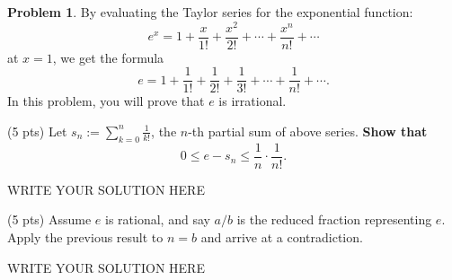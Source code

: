 \documentclass[11pt]{article}
\theoremstyle{plain}
\theoremstyle{definition}
\newtheorem{problem}{Problem}
\theoremstyle{remark}
\numberwithin{equation}{problem}
\begin{document}
\begin{problem}
	By evaluating the Taylor series for the exponential function:
	\[
		e^{x} = 1 + \frac{x}{1!} + \frac{x^2}{2!} + \cdots + \frac{x^n}{n!} + \cdots
	\]
	at $x=1$, we get the formula
	\[
		e = 1 + \frac{1}{1!} + \frac{1}{2!} + \frac{1}{3!} + \cdots + \frac{1}{n!} + \cdots.
	\]
	In this problem, you will prove that $e$ is irrational.
	\begin{listinprob}
		\item (5 pts) Let $s_n := \sum\limits_{k=0}^n \frac{1}{k!}$, the $n$-th partial sum of above series. \textbf{Show that} 
		\[
			0 \leq e - s_n \leq \frac{1}{n}\cdot \frac{1}{n!}.
		\]
\begin{solution} %
WRITE YOUR SOLUTION HERE
\end{solution}\clearpage %
		\item (5 pts) Assume $e$ is rational, and say $a/b$ is the reduced fraction representing $e$. Apply the previous result to $n = b$ and arrive at a contradiction.
	\end{listinprob}
\end{problem}
\begin{solution} %
WRITE YOUR SOLUTION HERE
\end{solution}\clearpage %
\end{document}
